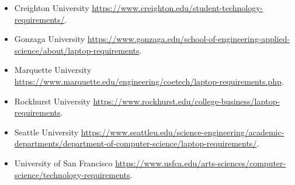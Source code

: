 \begin{itemize}

    \item Creighton University \newline\href{https://www.creighton.edu/student-technology-requirements/}{https://www.creighton.edu/student-technology-requirements/}.
   
    \item Gonzaga University \newline\href{https://www.gonzaga.edu/school-of-engineering-applied-science/about/laptop-requirements}{https://www.gonzaga.edu/school-of-engineering-applied-science/about/laptop-requirements}.
    
    \item Marquette University \newline\href{https://www.marquette.edu/engineering/coetech/laptop-requirements.php}{https://www.marquette.edu/engineering/coetech/laptop-requirements.php}.
    
    \item Rockhurst University \newline\href{https://www.rockhurst.edu/college-business/laptop-requirements}{https://www.rockhurst.edu/college-business/laptop-requirements}.

    \item Seattle University \newline \href{https://www.seattleu.edu/science-engineering/academic-departments/department-of-computer-science/laptop-requirements/}{https://www.seattleu.edu/science-engineering/academic-departments/department-of-computer-science/laptop-requirements/}.

     \item University of San Francisco \newline\href{https://www.usfca.edu/arts-sciences/computer-science/technology-requirements}{https://www.usfca.edu/arts-sciences/computer-science/technology-requirements}.

\end{itemize}